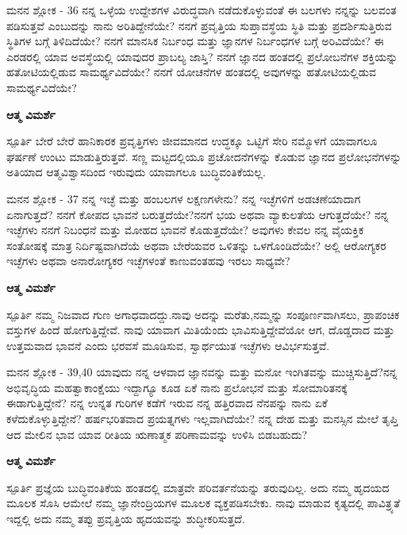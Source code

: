 \newpage
\begin{mananam}{\mananamfont ಮನನ ಶ್ಲೋಕ - \textenglish{36}}
\footnotesize \mananamtext ನನ್ನ ಒಳ್ಳೆಯ ಉದ್ದೇಶಗಳ ವಿರುದ್ಧವಾಗಿ ನಡೆದುಕೊಳ್ಳುವಂತೆ ಈ ಬಲಗಳು ನನ್ನನ್ನು ಬಲವಂತ ಪಡಿಸುತ್ತವೆ ಎಂಬುದನ್ನು ನಾನು 
 ಅರಿತಿದ್ದೇನೆಯೇ? ನನಗೆ ಪ್ರವೃತ್ತಿಯ ಸುಪ್ತಾವಸ್ಥೆಯ    ಸ್ಥಿತಿ ಮತ್ತು ಪ್ರದರ್ಶಿಸುತ್ತಿರುವ ಸ್ಥಿತಿಗಳ ಬಗ್ಗೆ ತಿಳಿದಿದೆಯೇ? ನನಗೆ ಮಾನಸಿಕ ನಿರ್ಬಂಧ ಮತ್ತು ಜ್ಞಾನಗಳ ನಿರ್ಬಂಧಗಳ ಬಗ್ಗೆ ಅರಿವಿದೆಯೇ? ಈ ಎರಡರಲ್ಲಿ ಯಾವ ಅವಸ್ಥೆಯಲ್ಲಿ ಯಾವುದರ ಪ್ರಾಬಲ್ಯ ಜಾಸ್ತಿ? ನನಗೆ ಜ್ಞಾನದ ಹಂತದಲ್ಲಿ ಪ್ರಲೋಬನೆಗಳ ಶಕ್ತಿಯನ್ನು ಹತೋಟಿಯಲ್ಲಿಡುವ ಸಾಮರ್ಥ್ಯವಿದೆಯೇ? ನನಗೆ ಯೋಚನೆಗಳ ಹಂತದಲ್ಲಿ ಅವುಗಳನ್ನು ಹತೋಟಿಯಲ್ಲಿಡುವ ಸಾಮರ್ಥ್ಯವಿದೆಯೇ?
\end{mananam}
\WritingHand\enspace\textbf{ಆತ್ಮ ವಿಮರ್ಶೆ}\\
\begin{inspiration}{\mananamfont ಸ್ಪೂರ್ತಿ}
\footnotesize \mananamtext ಬೇರೆ ಬೇರೆ ಹಾನಿಕಾರಕ ಪ್ರವೃತ್ತಿಗಳು ಜೀವಮಾನದ ಉದ್ಧಕ್ಕೂ ಒಟ್ಟಿಗೆ ಸೇರಿ ನಮ್ಮೊಳಗೆ ಯಾವಾಗಲೂ ಘರ್ಷಣೆ ಉಂಟು ಮಾಡುತ್ತಿರುತ್ತವೆ. ಸಣ್ಣ ಮಟ್ಟದಲ್ಲಿಯೂ ಪ್ರಚೋದನೆಗಳನ್ನು ಕೊಡುವ ಜ್ಞಾನದ ಪ್ರಲೋಭನೆಗಳನ್ನು ಅತಿಯಾದ ಆತ್ಮವಿಶ್ವಾಸದಿಂದ ಇರುವುದು ಯಾವಾಗಲೂ ಬುದ್ಧಿವಂತಿಕೆಯಲ್ಲ.
\end{inspiration}
\newpage

\begin{mananam}{\mananamfont ಮನನ ಶ್ಲೋಕ - \textenglish{37}}
\footnotesize \mananamtext ನನ್ನ ಇಚ್ಛೆ ಮತ್ತು ಹಂಬಲಗಳ ಲಕ್ಷಣಗಳೇನು? ನನ್ನ ಇಚ್ಛೆಗಳಿಗೆ ಅಡಚಣೆಯಾದಾಗ ಏನಾಗುತ್ತದೆ? ನನಗೆ ಕೋಪದ ಭಾವನೆ ಬರುತ್ತದೆಯೇ?ನನಗೆ ಭಯ ಅಥವಾ ವ್ಯಾಕುಲತೆಯ ಆಗುತ್ತದೆಯೇ? ನನ್ನ ಇಚ್ಛೆಗಳು ನನಗೆ ನಿಬಂಧನೆ ಮತ್ತು ಮೋಹದ ಭಾವನೆ ಕೊಡುತ್ತದೆಯೇ? ಅವುಗಳು ಕೇವಲ ನನ್ನ ವೈಯಕ್ತಿಕ ಸಂತೋಷಕ್ಕೆ ಮಾತ್ರ ನಿರ್ದಿಷ್ಟವಾಗಿದೆಯೆ ಅಥವಾ ಬೇರೆಯವರ ಒಳಿತನ್ನು ಒಳಗೊಂಡಿದೆಯೇ? ಅಲ್ಲಿ ಆರೋಗ್ಯಕರ ಇಚ್ಛೆಗಳು ಅಥವಾ ಅನಾರೋಗ್ಯಕರ ಇಚ್ಛೆಗಳಂತೆ ಕಾಣುವಂತಹವು ಇರಲು ಸಾಧ್ಯವೇ?
\end{mananam}
\WritingHand\enspace\textbf{ಆತ್ಮ ವಿಮರ್ಶೆ}\\
\begin{inspiration}{\mananamfont ಸ್ಪೂರ್ತಿ}
\footnotesize \mananamtext ನಮ್ಮ ನಿಜವಾದ ಗುಣ ಅಗಾಧವಾದದ್ದು.ನಾವು ಅದನ್ನು ಮರೆತು,ನಮ್ಮನ್ನು ಸಂಪೂರ್ಣವಾಗಿಸಲು, ಪ್ರಾಪಂಚಿಕ ವಸ್ತುಗಳ ಹಿಂದೆ ಹೋಗುತ್ತಿದ್ದೇವೆ. ನಾವು ಯಾವಾಗ ಮಿತಿಯೆಂದು ಭಾವಿಸುತ್ತಿದ್ದೇವೆಯೋ ಆಗ, ದೊಡ್ಡದಾದ ಮತ್ತು ಉತ್ತಮವಾದ ಭಾವನೆ ಎಂದು ಭರವಸೆ ಮೂಡಿಸುವ, ಸ್ವಾರ್ಥಯುತ ಇಚ್ಛೆಗಳು ಆವಿರ್ಭಸುತ್ತವೆ. 
\end{inspiration}
\newpage

\begin{mananam}{\mananamfont ಮನನ ಶ್ಲೋಕ - \textenglish{39,40}}
\footnotesize \mananamtext ಯಾವುದು ನನ್ನ ಆಳವಾದ ಜ್ಞಾನವನ್ನು ಮತ್ತು ಮನೋ ಇಂಗಿತವನ್ನು ಮುಚ್ಚಿಸುತ್ತಿದೆ?ನನ್ನ ಅಭಿವೃದ್ಧಿಯ ಮಹತ್ವಾಕಾಂಕ್ಷೆಯು ಇದ್ದಾಗ್ಯೂ ಕೂಡ ಏಕೆ ನಾನು ಪ್ರಲೋಭನೆ ಮತ್ತು ಸೋಮಾರಿತನಕ್ಕೆ ಈಡಾಗುತ್ತಿದ್ದೇನೆ? ನನ್ನ ಉನ್ನತ ಗುರಿಗಳ ಕಡೆಗೆ ಇರುವ ನನ್ನ ಹತ್ತಿರವಾದ ನೆನಪನ್ನು ನಾನು ಏಕೆ ಕಳೆದುಕೊಳ್ಳುತ್ತಿದ್ದೇನೆ? ಹರ್ಷಭರಿತವಾದ ಪ್ರಯತ್ನಗಳು ಇಲ್ಲವಾಗಿದೆಯೇ? ನನ್ನ ದೇಹ ಮತ್ತು ಮನಸ್ಸಿನ ಮೇಲೆ ತೃಪ್ತಿ ಆದ ಮೇಲಿನ ಭಾವ ಯಾವ ರೀತಿಯ ಋಣಾತ್ಮಕ ಪರಿಣಾಮವನ್ನು ಉಳಿಸಿ ಬಿಡಬಹುದು?
\end{mananam}
\WritingHand\enspace\textbf{ಆತ್ಮ ವಿಮರ್ಶೆ}\\
\begin{inspiration}{\mananamfont ಸ್ಪೂರ್ತಿ}
\footnotesize \mananamtext ಪ್ರಜ್ಞೆಯ ಬುದ್ಧಿವಂತಿಕೆಯ ಹಂತದಲ್ಲಿ ಮಾತ್ರವೇ ಪರಿವರ್ತನೆಯನ್ನು ತರುವುದಿಲ್ಲ. ಅದು ನಮ್ಮ ಹೃದಯದ ಮೂಲಕ ಸೊಸಿ ಆಮೇಲೆ ನಮ್ಮ ಜ್ಞಾನೇಂದ್ರಿಯಗಳ ಮೂಲಕ  ವ್ಯಕ್ತಪಡಿಸಬೇಕು. ನಾವು ಮಾಡುವ ಕೃತ್ಯದಲ್ಲಿ ಪಾವಿತ್ರ್ಯತೆ ಇದ್ದಲ್ಲಿ ಅದು ನಮ್ಮ ತಪ್ಪು ಪ್ರವೃತ್ತಿಯ ಹೃದಯವನ್ನು ಶುದ್ಧೀಕರಿಸುತ್ತದೆ.
\end{inspiration}
\newpage

